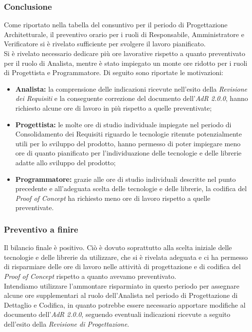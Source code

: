\subsubsection{Conclusione}
Come riportato nella tabella del consuntivo per il periodo di Progettazione Architetturale, il preventivo orario per i ruoli di Responsabile, Amministratore e Verificatore si è rivelato sufficiente per svolgere il lavoro pianificato. \\
Si è rivelato necessario dedicare più ore lavorative rispetto a quanto preventivato per il ruolo di Analista, mentre è stato impiegato un monte ore ridotto per i ruoli di Progettista e Programmatore. Di seguito sono riportate le motivazioni:
\begin{itemize}
	\item \textbf{Analista:} la comprensione delle indicazioni ricevute nell'esito della \textit{Revisione dei Requisiti} e la conseguente correzione del documento dell'\textit{AdR{} 2.0.0}, hanno richiesto alcune ore di lavoro in più rispetto a quelle preventivate;
	\item \textbf{Progettista:} le molte ore di studio individuale impiegate nel periodo di Consolidamento dei Requisiti riguardo le tecnologie ritenute potenzialmente utili per lo sviluppo del prodotto, hanno permesso di poter impiegare meno ore di quanto pianificato per l'individuazione delle tecnologie e delle librerie adatte allo sviluppo del prodotto;
	\item \textbf{Programmatore:} grazie alle ore di studio individuali descritte nel punto precedente e all'adeguata scelta delle tecnologie e delle librerie, la codifica del \textit{Proof of Concept} ha richiesto meno ore di lavoro rispetto a quelle preventivate.
\end{itemize}

\subsubsection{Preventivo a finire}
Il bilancio finale è positivo. Ciò è dovuto soprattutto alla scelta iniziale delle tecnologie e delle librerie da utilizzare, che si è rivelata adeguata e ci ha permesso di risparmiare delle ore di lavoro nelle attività di progettazione e di codifica del \textit{Proof of Concept} rispetto a quanto avevamo preventivato. \\
Intendiamo utilizzare l'ammontare risparmiato in questo periodo per assegnare alcune ore supplementari al ruolo dell'Analista nel periodo di Progettazione di Dettaglio e Codifica, in quanto potrebbe essere necessario apportare modifiche al documento dell'\textit{AdR{} 2.0.0}, seguendo eventuali indicazioni ricevute a seguito dell'esito della \textit{Revisione di Progettazione}.

